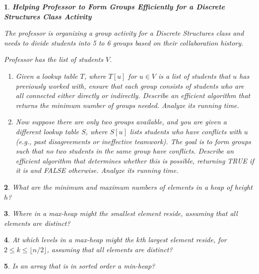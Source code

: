 \documentclass[%
addpoints]{exam}
\theoremstyle{problem}
\newtheorem{p}{}
\begin{document}
\begin{p}
\textbf{Helping Professor to Form Groups Efficiently for a Discrete Structures Class Activity}  

The professor is organizing a group activity for a Discrete Structures class and needs to divide students into 5 to 6 groups based on their collaboration history.  

Professor has the list of students \( V \).
\begin{enumerate}[label=\alph*)]
    \item Given a lookup table \( T \), where \( T[u] \) for \( u \in V \) is a list of students that \( u \) has previously worked with, ensure that each group consists of students who are all connected either directly or indirectly. Describe an efficient algorithm that returns the minimum number of groups needed. Analyze its running time. 
    \item Now suppose there are only two groups available, and you are given a different lookup table \( S \), where \( S[u] \) lists students who have conflicts with \( u \) (e.g., past disagreements or ineffective teamwork). The goal is to form groups such that no two students in the same group have conflicts. Describe an efficient algorithm that determines whether this is possible, returning TRUE if it is and FALSE otherwise. Analyze its running time.  
\end{enumerate}
\hfill\end{p}


\begin{p}
What are the minimum and maximum numbers of elements in a heap of height \( h \)?
\hfill\end{p}

\begin{p}
Where in a max-heap might the smallest element reside, assuming that all elements are distinct?
\hfill\end{p}

\begin{p} 
At which levels in a max-heap might the \( k \)th largest element reside, for \( 2 \leq k \leq \lfloor n/2 \rfloor \), assuming that all elements are distinct?  
\hfill  
\end{p}

\begin{p} 
Is an array that is in sorted order a min-heap?  
\hfill  
\end{p}
\end{document}
